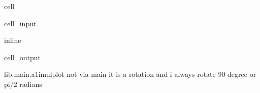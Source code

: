 \documentclass[letterpaper,10pt,english]{jupyterBook}
\begin{document}
\begin{sphinxuseclass}{cell}\begin{sphinxVerbatimInput}

\begin{sphinxuseclass}{cell_input}
\begin{sphinxVerbatim}[commandchars=\\\{\}]
 inline
 
\end{sphinxVerbatim}

\end{sphinxuseclass}\end{sphinxVerbatimInput}
\begin{sphinxVerbatimOutput}

\begin{sphinxuseclass}{cell_output}
\begin{sphinxVerbatim}[commandchars=\\\{\}]
lib.main.a1\PYGZus{}i\PYGZus{}mul\PYGZus{}plot
not via main
it is a rotation
and i always rotate 90 degree or pi/2 radians
\end{sphinxVerbatim}

\noindent{}

\end{sphinxuseclass}\end{sphinxVerbatimOutput}

\end{sphinxuseclass}
\end{document}
